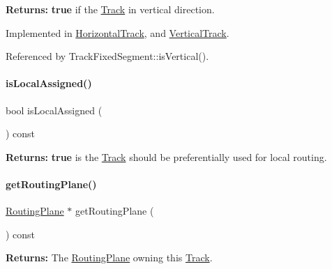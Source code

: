 {\bfseries Returns\+:} {\bfseries true} if the \hyperlink{classKite_1_1Track}{Track} in vertical direction. 

Implemented in \hyperlink{classKite_1_1HorizontalTrack_abd54544ef1710ee4b67cfb021d73446c}{Horizontal\+Track}, and \hyperlink{classKite_1_1VerticalTrack_abd54544ef1710ee4b67cfb021d73446c}{Vertical\+Track}.



Referenced by Track\+Fixed\+Segment\+::is\+Vertical().

\mbox{\label{classKite_1_1Track_a6835a410623b90e8abec4c7a4e0905b3}} 
\paragraph{\texorpdfstring{is\+Local\+Assigned()}{isLocalAssigned()}}
{\footnotesize\ttfamily bool is\+Local\+Assigned (\begin{DoxyParamCaption}{ }\end{DoxyParamCaption}) const\hspace{0.3cm}{\ttfamily [inline]}}

{\bfseries Returns\+:} {\bfseries true} is the \hyperlink{classKite_1_1Track}{Track} should be preferentially used for local routing. \mbox{\label{classKite_1_1Track_a056650e788f5235d0c4cc49e870f29b4}} 
\paragraph{\texorpdfstring{get\+Routing\+Plane()}{getRoutingPlane()}}
{\footnotesize\ttfamily \hyperlink{classKite_1_1RoutingPlane}{Routing\+Plane} $\ast$ get\+Routing\+Plane (\begin{DoxyParamCaption}{ }\end{DoxyParamCaption}) const\hspace{0.3cm}{\ttfamily [inline]}}

{\bfseries Returns\+:} The \hyperlink{classKite_1_1RoutingPlane}{Routing\+Plane} owning this \hyperlink{classKite_1_1Track}{Track}. \mbox{\label{classKite_1_1Track_af7373bd3a4ee8fcf28a316230ed37fc0}} 
